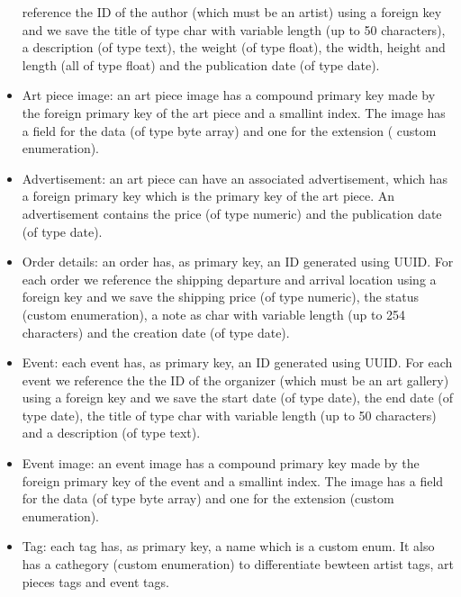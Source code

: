 \begin{itemize}
    reference the ID of the author (which must be an artist) using a foreign key and we save the title of type char
    with variable length (up to 50 characters), a description (of type text), the weight (of type float), the width, 
    height and length (all of type float) and the publication date (of type date).
    \item Art piece image: an art piece image has a compound primary key made by the foreign primary key of the art 
    piece and a smallint index. The image has a field for the data (of type byte array) and one for the extension (
    custom enumeration).
    \item Advertisement: an art piece can have an associated advertisement, which has a foreign primary key which 
    is the primary key of the art piece. An advertisement contains the price (of type numeric) and the publication
    date (of type date).
    \item Order details: an order has, as primary key, an ID generated using UUID. For each order we reference the 
    shipping departure and arrival location using a foreign key and we save the shipping price (of type numeric), the 
    status (custom enumeration), a note as char with variable length (up to 254 characters) and the creation date (of 
    type date).
    \item Event: each event has, as primary key, an ID generated using UUID. For each event we reference the 
    the ID of the organizer (which must be an art gallery) using a foreign key and we save the start date (of type
    date), the end date (of type date), the title of type char with variable length (up to 50 characters) and a 
    description (of type text).
    \item Event image: an event image has a compound primary key made by the foreign primary key of the event and a 
    smallint index. The image has a field for the data (of type byte array) and one for the extension (custom 
    enumeration).
    \item Tag: each tag has, as primary key, a name which is a custom enum. It also has a cathegory (custom enumeration)
     to differentiate bewteen artist tags, art pieces tags and event tags.
\end{itemize}